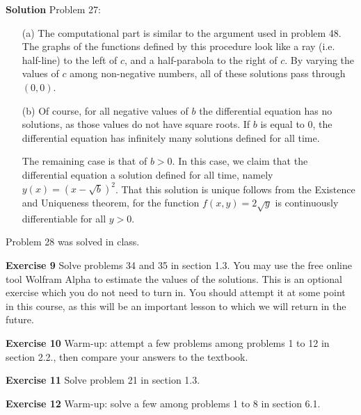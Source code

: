 \documentclass[12pt,oneside]{exam}
\newenvironment{exercise}[1]{\vspace{.1in}\noindent\textbf{Exercise #1 \hspace{.05em}}}{}
\newenvironment{newsolution}{\vspace{.1in}\noindent\textbf{Solution \hspace{.05em}}}{}
\begin{document}
\begin{newsolution}
Problem 27: 

\begin{itemize}
\item[(a)] The computational part is similar to the argument used in problem 48. The graphs of the functions defined by this procedure look like a ray (i.e. half-line) to the left of $c$, and a half-parabola to the right of $c$. By varying the values of $c$ among non-negative numbers, all of these solutions pass through $(0,0)$. 
\item[(b)] Of course, for all negative values of $b$ the differential equation has no solutions, as those values do not have square roots. If $b$ is equal to $0$, the differential equation has infinitely many solutions defined for all time.

The remaining case is that of $b>0$. In this case, we claim that the differential equation a solution defined for all time, namely $y(x)=(x-\sqrt{b})^2$. That this solution is unique follows from the Existence and Uniqueness theorem, for the function $f(x,y)=2\sqrt{y}$ is continuously differentiable for all $y >0$. 
\end{itemize}

Problem 28 was solved in class. 

\end{newsolution}

\begin{exercise}{9}
Solve problems 34 and 35 in section 1.3. You may use the free online tool Wolfram Alpha to estimate the values of the solutions. This is an optional exercise which you do not need to turn in. You should attempt it at some point in this course, as this will be an important lesson to which we will return in the future. 
\end{exercise}

\begin{exercise}{10}
Warm-up: attempt a few problems among problems 1 to 12 in section 2.2., then compare your answers to the textbook. 
\end{exercise}

\begin{exercise}{11}
Solve problem 21 in section 1.3. 
\end{exercise}

\begin{exercise}{12}
Warm-up: solve a few among problems 1 to 8 in section 6.1. 
\end{exercise}
\end{document}
